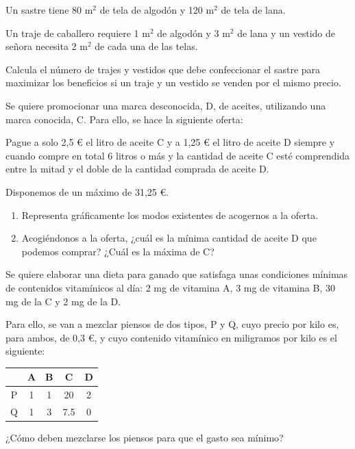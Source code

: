 \begin{Ejer}
Un sastre tiene 80 m$^2$ de tela de algod\'on y 120 m$^2$ de tela de lana.

Un traje de caballero requiere 1 m$^2$ de algod\'on y 3 m$^2$ de lana y un vestido de se\~nora necesita 2 m$^2$ de cada una de las telas.

Calcula el n\'umero de trajes y vestidos que debe confeccionar el sastre para maximizar los beneficios si un traje y un vestido se venden por el mismo precio.
\end{Ejer}


\begin{Ejer}
Se quiere promocionar una marca desconocida, D, de aceites, utilizando una marca conocida, C. Para ello, se hace la siguiente oferta:

Pague a solo 2,5 € el litro de aceite C y a 1,25 € el litro de aceite D siempre y cuando compre en total 6 litros o m\'as y la cantidad de aceite C est\'e comprendida entre la mitad y el doble de la cantidad comprada de aceite D.

Disponemos de un m\'aximo de 31,25 €.

\begin{enumerate}
\item Representa gr\'aficamente los modos existentes de acogernos a la oferta.
\item Acogi\'endonos a la oferta, ¿cu\'al es la m\'inima cantidad de aceite D que podemos comprar? ¿Cu\'al es la m\'axima de C?
\end{enumerate}
\end{Ejer}

\begin{Ejer}
Se quiere elaborar una dieta para ganado que satisfaga unas condiciones m\'inimas de contenidos vitam\'inicos al d\'ia: 2 mg de vitamina A, 3 mg de vitamina B, 30 mg de la C y 2 mg de la D.

Para ello, se van a mezclar piensos de dos tipos, P y Q, cuyo precio por kilo es, para ambos, de 0,3 €, y cuyo contenido vitam\'inico en miligramos por kilo es el siguiente:

\begin{center}
\begin{tabular}{c|cccc}
 & A & B & C & D \\
\hline
P & 1 & 1 & 20 & 2 \\
Q & 1 & 3 & 7.5 & 0 \\
\end{tabular}
\end{center}

¿C\'omo deben mezclarse los piensos para que el gasto sea m\'inimo?
\end{Ejer}

